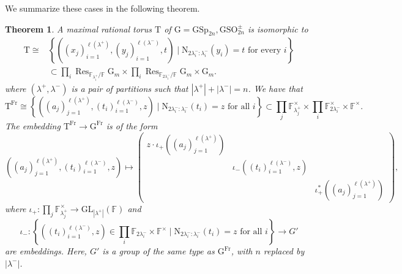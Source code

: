 \documentclass[12pt, reqno]{amsart}
\newtheorem{theorem}{Theorem}[section]
\theoremstyle{definition}
\theoremstyle{definition}
\theoremstyle{definition}
\newcommand{\multiplicativegroup}[1]{#1^{\times}}
\newcommand{\lengthof}{\ell}
\newcommand{\sizeof}[1]{\left|#1\right|}
\newcommand{\GL}{\mathrm{GL}}
\newcommand{\GSO}{\mathrm{GSO}}
\newcommand{\GSp}{\mathrm{GSp}}
\newcommand{\FieldNorm}[2]{\mathrm{N}_{#1:#2}}
\newcommand{\finiteField}{\mathbb{F}}
\newcommand{\finiteFieldExtension}[1]{\finiteField_{#1}}
\newcommand{\Frobenius}{\operatorname{Fr}}
\newcommand{\restrictionOfScalars}[3]{\operatorname{Res}_{#1 \slash #2}{#3}}
\newcommand{\multiplcativeScheme}{\algebraicGroup{G}_m}
\newcommand{\algebraicGroup}[1]{\boldsymbol{\mathrm{#1}}}
\begin{document}
	We summarize these cases in the following theorem.
	\begin{theorem}
	A maximal rational torus $\algebraicGroup{T}$ of $\algebraicGroup{G} =  \algebraicGroup{\GSp}_{2n}, \algebraicGroup{\GSO}_{2n}^{\pm}$ is isomorphic to \begin{align*}
		\algebraicGroup{T} \cong& \left\{\left(\left(x_j\right)_{i=1}^{\lengthof\left(\lambda^+\right)},\left(y_j\right)_{i=1}^{\lengthof\left(\lambda^-\right)},t\right)  \mid \FieldNorm{2\lambda_i^-}{\lambda_i^-}(y_i) = t \text{ for every } i\right\} \\
		& \subset \prod_{i} \restrictionOfScalars{\finiteFieldExtension{\lambda^+_i}}{\finiteField}{\multiplcativeScheme} \times \prod_{i} \restrictionOfScalars{\finiteFieldExtension{2\lambda^-_i}}{\finiteField}{\multiplcativeScheme}  \times \multiplcativeScheme.
	\end{align*}
	where $\left(\lambda^+, \lambda^-\right)$ is a pair of partitions such that $\sizeof{\lambda^+} + \sizeof{\lambda^-} = n$. We have that $$\algebraicGroup{T}^{\Frobenius} \cong \left\{\left(\left(a_j\right)_{j = 1}^{\lengthof\left(\lambda^+\right)}, \left(t_i\right)_{i = 1}^{\lengthof\left(\lambda^-\right)}, z\right) \mid \FieldNorm{2 \lambda_i^{-}}{\lambda_i^{-}}\left(t_i\right) = z \text{ for all } i \right\} \subset \prod_{j} \multiplicativegroup{\finiteFieldExtension{\lambda_j^+}} \times \prod_{i} \multiplicativegroup{\finiteFieldExtension{2 \lambda_i^{-}}} \times \multiplicativegroup{\finiteField}.$$ The embedding $\algebraicGroup{T}^{\Frobenius} \to \algebraicGroup{G}^{\Frobenius}$ is of the form $$\left(\left(a_j\right)_{j=1}^{\lengthof\left(\lambda^+\right)}, \left(t_i\right)_{i=1}^{\lengthof\left(\lambda^-\right)}, z\right) \mapsto
	\begin{pmatrix}
		z \cdot \iota_+\left( \left(a_j\right)_{j=1}^{\lengthof\left(\lambda^+\right)}\right)\\
		& \iota_{-}\left( \left(t_i\right)_{i=1}^{\lengthof\left(\lambda^-\right)}, z
		\right) &\\
		& & \iota_+^{\ast}\left( \left(a_j\right)_{j=1}^{\lengthof\left(\lambda^+\right)}\right)
	\end{pmatrix},$$
	where $\iota_+ \colon \prod_{j} \multiplicativegroup{\finiteFieldExtension{\lambda_j^+}} \to \GL_{\sizeof{\lambda^+}}\left(\finiteField\right)$ and $$\iota_- \colon \left\{ \left(\left(t_i\right)_{i=1}^{\lengthof\left(\lambda^-\right)}, z\right)\in \prod_{i} \finiteFieldExtension{2\lambda^{-}_i} \times \multiplicativegroup{\finiteField} \mid \FieldNorm{2 \lambda_i^{-}}{\lambda_i^{-}}\left(t_i\right) = z \text{ for all } i \right\} \to G'$$ are embeddings. Here, $G'$ is a group of the same type as $\algebraicGroup{G}^{\Frobenius}$, with $n$ replaced by $\sizeof{\lambda^{-}}$.
\end{theorem}
\end{document}
